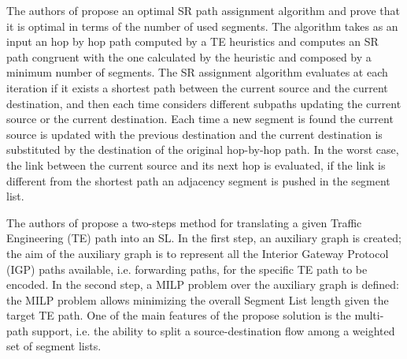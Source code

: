 The authors of \cite{pmsr} propose an optimal SR path assignment algorithm and prove that it is optimal in terms of the number of used segments. The algorithm takes as an input an hop by hop path computed by a TE heuristics and computes an SR path congruent with the one calculated by the heuristic and composed by a minimum number of segments. 
The SR assignment algorithm evaluates at each iteration if it exists a shortest path between the current source and the current destination, and then each time considers different subpaths updating the current source or the current destination. 
Each time a new segment is found the current source is updated with the previous destination and the current destination is substituted by the destination of the original hop-by-hop path. In the worst case, the link between the current source and its next hop is evaluated, if the link is different from the shortest path an adjacency segment is pushed in the segment list. 

The authors of \cite{translating} propose a two-steps method for translating a given Traffic Engineering (TE) path into an SL. In the first step, an auxiliary graph is created; the aim of the auxiliary graph is to represent all the Interior Gateway Protocol (IGP) paths available, i.e. forwarding paths, for the specific TE path to be encoded. In the second step, a MILP problem over the auxiliary graph is defined: the MILP problem allows minimizing the overall Segment List length given the target TE path. One of the main features of the propose solution is the multi-path support, i.e. the ability to split a source-destination flow among a weighted set of segment lists. 

